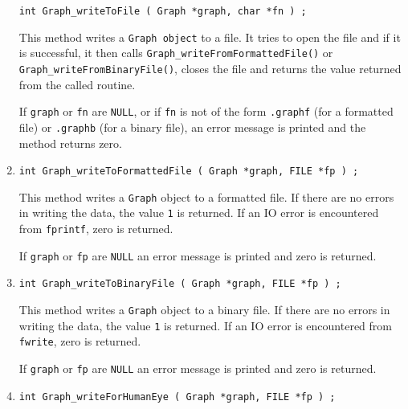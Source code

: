 \begin{enumerate}
\begin{verbatim}
int Graph_writeToFile ( Graph *graph, char *fn ) ;
\end{verbatim}
\par
This method writes a {\tt Graph object} to a file.
It tries to open the file and if it is successful, 
it then calls {\tt Graph\_writeFromFormattedFile()} or
{\tt Graph\_writeFromBinaryFile()},
closes the file
and returns the value returned from the called routine.
\par {}
If {\tt graph} or {\tt fn} are {\tt NULL}, 
or if {\tt fn} is not of the form
{\tt *.graphf} (for a formatted file) 
or {\tt *.graphb} (for a binary file),
an error message is printed and the method returns zero.
\item
\begin{verbatim}
int Graph_writeToFormattedFile ( Graph *graph, FILE *fp ) ;
\end{verbatim}
\par
This method writes a {\tt Graph} object to a formatted file.
If there are no errors in writing the data, 
the value {\tt 1} is returned.
If an IO error is encountered from {\tt fprintf}, zero is returned.
\par {}
If {\tt graph} or {\tt fp} are {\tt NULL} an error message 
is printed and zero is returned.
\item
\begin{verbatim}
int Graph_writeToBinaryFile ( Graph *graph, FILE *fp ) ;
\end{verbatim}
\par
This method writes a {\tt Graph} object to a binary file.
If there are no errors in writing the data, 
the value {\tt 1} is returned.
If an IO error is encountered from {\tt fwrite}, zero is returned.
\par {}
If {\tt graph} or {\tt fp} are {\tt NULL} an error message 
is printed and zero is returned.
\item
\begin{verbatim}
int Graph_writeForHumanEye ( Graph *graph, FILE *fp ) ;

\end{verbatim}
\end{enumerate}
